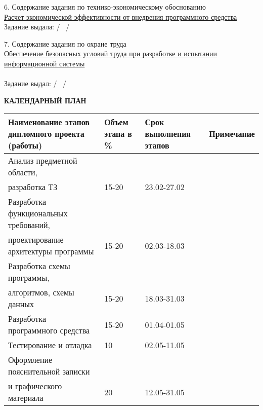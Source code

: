 {  \small{6. Содержание задания по технико-экономическому обоснованию} \\
  \uline{\small{Расчет экономической эффективности от внедрения программного средства}}\lineunderscore\\

  \small{Задание выдала: \uline{\hspace*{6em}} / \diplomaTaskEconConsultant~/}
  \vspace{1em}

  \small{7. Содержание задания по охране труда} \\
  \uline{\small{Обеспечение безопасных условий труда при разработке и испытании информационной системы}}\lineunderscore\\
  \lineunderscore\\

  \small{Задание выдал:  \uline{\hspace*{6em}} / \diplomaTaskLaborProtectionConsultant~/}

  \begin{center}
    \textbf{\small{КАЛЕНДАРНЫЙ ПЛАН}}
  \end{center}

  \begin{tabular}{| >{}m{} 
                  | >{\centering}m{}
                  | >{\centering}m{}  
                  | >{\centering\arraybackslash}m{}|}
    \hline \small{Наименование этапов дипломного проекта (работы)} & \small{Объем этапа в \%} & \small{Срок выполнения этапов} & \small{Примечание} \\
    \hline \small{Анализ предметной области,} & & & \\
    \hline \small{разработка ТЗ} & \small{15-20} & \small{23.02-27.02} & \\
    \hline \small{Разработка функциональных требований,} & & & \\
    \hline \small{проектирование архитектуры программы } & \small{15-20} & \small{02.03-18.03} & \\
    \hline \small{Разработка схемы программы},& & & \\
    \hline \small{алгоритмов, схемы данных} & \small{15-20} & \small{18.03-31.03} & \\
    \hline \small{Разработка программного средства} & \small{15-20} & \small{01.04-01.05} & \\
    \hline \small{Тестирование и отладка} & \small{10} & \small{02.05-11.05} & \\
    \hline \small{Оформление пояснительной записки} & & & \\
    \hline \small{и графического материала} & \small{20} & \small{12.05-31.05} & \\
    \hline
  \end{tabular}

}
